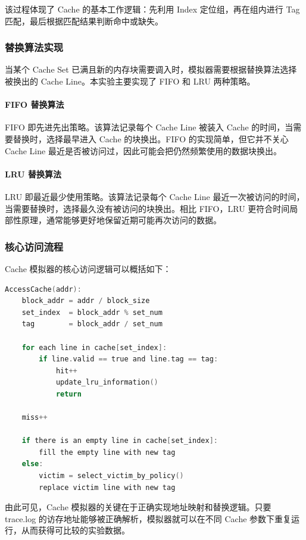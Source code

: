 该过程体现了 Cache 的基本工作逻辑：先利用 Index 定位组，再在组内进行 Tag 匹配，最后根据匹配结果判断命中或缺失。

\subsubsection{替换算法实现}

当某个 Cache Set 已满且新的内存块需要调入时，模拟器需要根据替换算法选择被换出的 Cache Line。本实验主要实现了 FIFO 和 LRU 两种策略。

\paragraph{FIFO 替换算法}

FIFO 即先进先出策略。该算法记录每个 Cache Line 被装入 Cache 的时间，当需要替换时，选择最早进入 Cache 的块换出。FIFO 的实现简单，但它并不关心 Cache Line 最近是否被访问过，因此可能会把仍然频繁使用的数据块换出。

\paragraph{LRU 替换算法}

LRU 即最近最少使用策略。该算法记录每个 Cache Line 最近一次被访问的时间，当需要替换时，选择最久没有被访问的块换出。相比 FIFO，LRU 更符合时间局部性原理，通常能够更好地保留近期可能再次访问的数据。

\subsubsection{核心访问流程}

Cache 模拟器的核心访问逻辑可以概括如下：

\begin{lstlisting}[language=C, caption={Cache 访问模拟的核心逻辑}]
AccessCache(addr):
    block_addr = addr / block_size
    set_index  = block_addr % set_num
    tag        = block_addr / set_num

    for each line in cache[set_index]:
        if line.valid == true and line.tag == tag:
            hit++
            update_lru_information()
            return

    miss++

    if there is an empty line in cache[set_index]:
        fill the empty line with new tag
    else:
        victim = select_victim_by_policy()
        replace victim line with new tag
\end{lstlisting}

由此可见，Cache 模拟器的关键在于正确实现地址映射和替换逻辑。只要 trace.log 的访存地址能够被正确解析，模拟器就可以在不同 Cache 参数下重复运行，从而获得可比较的实验数据。